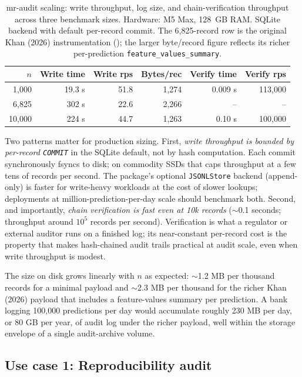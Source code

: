 \begin{table}[H]
\centering
\caption{mr-audit scaling: write throughput, log size, and chain-verification throughput across three benchmark sizes. Hardware: M5 Max, 128~GB RAM. SQLite backend with default per-record commit. The 6{,}825-record row is the original Khan (2026) instrumentation (); the larger byte/record figure reflects its richer per-prediction \texttt{feature\_values\_summary}.}\label{tab:scaling}
\footnotesize
\begin{tabular}{rrrrrr}
\toprule
$n$ & Write time & Write rps & Bytes/rec & Verify time & Verify rps \\
\midrule
1{,}000      & 19.3 s    & 51.8 & 1{,}274 & 0.009 s & 113{,}000 \\
6{,}825      & 302 s     & 22.6 & 2{,}266 & --      & --        \\
10{,}000     & 224 s     & 44.7 & 1{,}263 & 0.10 s  & 100{,}000 \\
\bottomrule
\end{tabular}
\end{table}

Two patterns matter for production sizing. First, \emph{write throughput is bounded by per-record \texttt{COMMIT}} in the SQLite default, not by hash computation. Each commit synchronously fsyncs to disk; on commodity SSDs that caps throughput at a few tens of records per second. The package's optional \texttt{JSONLStore} backend (append-only) is faster for write-heavy workloads at the cost of slower lookups; deployments at million-prediction-per-day scale should benchmark both. Second, and importantly, \emph{chain verification is fast even at 10k records} ($\sim$0.1 seconds; throughput around $10^5$ records per second). Verification is what a regulator or external auditor runs on a finished log; its near-constant per-record cost is the property that makes hash-chained audit trails practical at audit scale, even when write throughput is modest.

The size on disk grows linearly with $n$ as expected: $\sim$1.2 MB per thousand records for a minimal payload and $\sim$2.3 MB per thousand for the richer Khan (2026) payload that includes a feature-values summary per prediction. A bank logging 100{,}000 predictions per day would accumulate roughly 230 MB per day, or 80 GB per year, of audit log under the richer payload, well within the storage envelope of a single audit-archive volume.

\subsection{Use case 1: Reproducibility audit}\label{sec:demonstration_replay}

